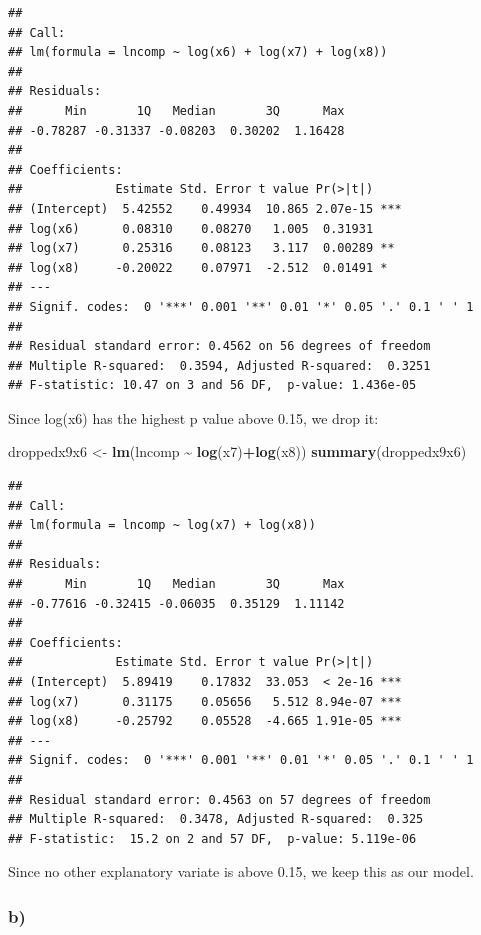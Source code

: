\documentclass[
]{article}
\newenvironment{Shaded}{\begin{snugshade}}{\end{snugshade}}
\newcommand{\FunctionTok}[1]{\textcolor[rgb]{0.13,0.29,0.53}{\textbf{#1}}}
\newcommand{\NormalTok}[1]{#1}
\newcommand{\OtherTok}[1]{\textcolor[rgb]{0.56,0.35,0.01}{#1}}
\newcommand{\SpecialCharTok}[1]{\textcolor[rgb]{0.81,0.36,0.00}{\textbf{#1}}}
\begin{document}
\begin{verbatim}
## 
## Call:
## lm(formula = lncomp ~ log(x6) + log(x7) + log(x8))
## 
## Residuals:
##      Min       1Q   Median       3Q      Max 
## -0.78287 -0.31337 -0.08203  0.30202  1.16428 
## 
## Coefficients:
##             Estimate Std. Error t value Pr(>|t|)    
## (Intercept)  5.42552    0.49934  10.865 2.07e-15 ***
## log(x6)      0.08310    0.08270   1.005  0.31931    
## log(x7)      0.25316    0.08123   3.117  0.00289 ** 
## log(x8)     -0.20022    0.07971  -2.512  0.01491 *  
## ---
## Signif. codes:  0 '***' 0.001 '**' 0.01 '*' 0.05 '.' 0.1 ' ' 1
## 
## Residual standard error: 0.4562 on 56 degrees of freedom
## Multiple R-squared:  0.3594, Adjusted R-squared:  0.3251 
## F-statistic: 10.47 on 3 and 56 DF,  p-value: 1.436e-05
\end{verbatim}

Since log(x6) has the highest p value above 0.15, we drop it:

\begin{Shaded}
\begin{Highlighting}[]
\NormalTok{droppedx9x6 }\OtherTok{\textless{}{-}} \FunctionTok{lm}\NormalTok{(lncomp }\SpecialCharTok{\textasciitilde{}} \FunctionTok{log}\NormalTok{(x7)}\SpecialCharTok{+}\FunctionTok{log}\NormalTok{(x8))}
\FunctionTok{summary}\NormalTok{(droppedx9x6)}
\end{Highlighting}
\end{Shaded}

\begin{verbatim}
## 
## Call:
## lm(formula = lncomp ~ log(x7) + log(x8))
## 
## Residuals:
##      Min       1Q   Median       3Q      Max 
## -0.77616 -0.32415 -0.06035  0.35129  1.11142 
## 
## Coefficients:
##             Estimate Std. Error t value Pr(>|t|)    
## (Intercept)  5.89419    0.17832  33.053  < 2e-16 ***
## log(x7)      0.31175    0.05656   5.512 8.94e-07 ***
## log(x8)     -0.25792    0.05528  -4.665 1.91e-05 ***
## ---
## Signif. codes:  0 '***' 0.001 '**' 0.01 '*' 0.05 '.' 0.1 ' ' 1
## 
## Residual standard error: 0.4563 on 57 degrees of freedom
## Multiple R-squared:  0.3478, Adjusted R-squared:  0.325 
## F-statistic:  15.2 on 2 and 57 DF,  p-value: 5.119e-06
\end{verbatim}

Since no other explanatory variate is above 0.15, we keep this as our
model.

\subsubsection{b)}\label{b-2}
\end{document}
